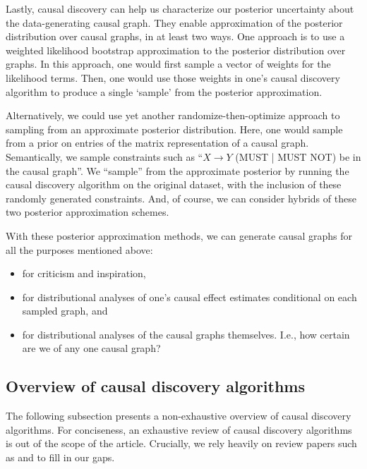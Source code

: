 Lastly, causal discovery can help us characterize our posterior uncertainty about the data-generating causal graph.
They enable approximation of the posterior distribution over causal graphs, in at least two ways.
One approach is to use a weighted likelihood bootstrap approximation \citep{newton_1994_approximate} to the posterior distribution over graphs.
In this approach, one would first sample a vector of weights for the likelihood terms.
Then, one would use those weights in one's causal discovery algorithm to produce a single `sample' from the posterior approximation.

Alternatively, we could use yet another randomize-then-optimize \citep{bardsley_2014_randomize, orabona_2014_measure} approach to sampling from an approximate posterior distribution.
Here, one would sample from a prior on entries of the matrix representation of a causal graph.
Semantically, we sample constraints such as ``$X \rightarrow Y$ (MUST | MUST NOT) be in the causal graph''.
We ``sample'' from the approximate posterior by running the causal discovery algorithm on the original dataset, with the inclusion of these randomly generated constraints.
And, of course, we can consider hybrids of these two posterior approximation schemes.

With these posterior approximation methods, we can generate causal graphs for all the purposes mentioned above:
\begin{itemize}
   \item for criticism and inspiration,
   \item for distributional analyses of one's causal effect estimates conditional on each sampled graph, and
   \item for distributional analyses of the causal graphs themselves.
   \newline
   I.e., how certain are we of any one causal graph?
\end{itemize}

\subsection{Overview of causal discovery algorithms}
\label{sec:discovery-overview}

The following subsection presents a non-exhaustive overview of causal discovery algorithms.
For conciseness, an exhaustive review of causal discovery algorithms is out of the scope of the article.
Crucially, we rely heavily on review papers such as \citet{glymour_2019_review} and \citet{spirtes_2016_causal} to fill in our gaps.


